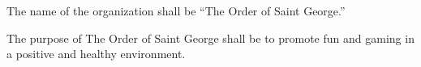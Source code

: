 {
	\begin{article}{}
		\item The name of the organization shall be \enquote{The Order of Saint George.}
		\item The purpose of The Order of Saint George shall be to promote fun and gaming in a positive and healthy environment.
	\end{article}
}